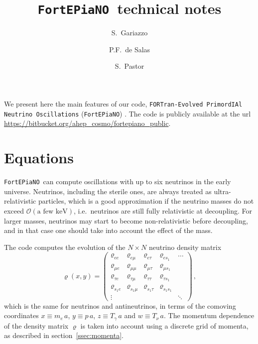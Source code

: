 \documentclass[notitlepage,showpacs,preprintnumbers,amsmath,amssymb,superscriptaddress,prd,onecolumn]{revtex4-1}
\newcommand{\fortepiano}{\texttt{FortEPiaNO}}
\begin{document}
\title{\boldmath \fortepiano\ technical notes}

\author{S.\ Gariazzo}

\author{P.F.\ de Salas}

\author{S.\ Pastor}


\maketitle


We present here the main features of
our code, \texttt{FORTran-Evolved PrimordIAl Neutrino Oscillations}
(\fortepiano) \cite{Gariazzo:2019gyi}.
The code is publicly available at the url
\url{https://bitbucket.org/ahep_cosmo/fortepiano_public}.


\section{Equations}
\fortepiano\ can compute oscillations with up to six neutrinos in the early universe.
Neutrinos, including the sterile ones, are always treated as ultra-relativistic particles, which is a good approximation if the
neutrino masses do not exceed $\mathcal{O}(\mbox{a few keV})$,
i.e.\ neutrinos are still fully relativistic at decoupling.
For larger masses, neutrinos may start to become non-relativistic before decoupling,
and in that case one should take into account the effect of the mass.

The code computes the evolution of the
$N\times N$ neutrino density matrix
\cite{deSalas:2016ztq,Mirizzi:2012we,Saviano:2013ktj,Mangano:2001iu}
\begin{equation}\label{eq:varrho-B4}
\varrho(x, y)
=
\left(
\begin{array}{ccccc}
\varrho_{ee}&\varrho_{e\mu}&\varrho_{e\tau}&\varrho_{es_1}&\ldots\\
\varrho_{\mu e}&\varrho_{\mu\mu}&\varrho_{\mu\tau}&\varrho_{\mu s_1}&\\
\varrho_{\tau e}&\varrho_{\tau\mu}&\varrho_{\tau\tau}&\varrho_{\tau s_1}&\\
\varrho_{s_1e}&\varrho_{s_1\mu}&\varrho_{s_1\tau}&\varrho_{s_1s_1}&\\
\vdots&&&&\ddots
\end{array}
\right)\,,
\end{equation}
which is the same for neutrinos and antineutrinos,
in terms of the comoving coordinates
$x\equiv m_e\, a$, $y\equiv p\, a$, $z\equiv T_\gamma\, a$ and $w\equiv T_\nu\,a$.
The momentum dependence of the density matrix $\varrho$ is taken into account
using a discrete grid of momenta, as described in section~\ref{ssec:momenta}.
\end{document}
